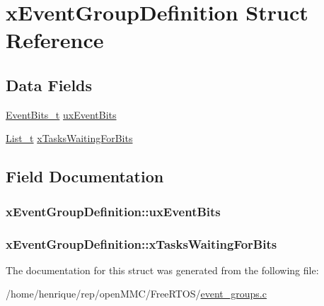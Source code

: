 \hypertarget{structxEventGroupDefinition}{\section{x\-Event\-Group\-Definition Struct Reference}
\label{structxEventGroupDefinition}
}
\subsection*{Data Fields}
\begin{DoxyCompactItemize}
\item 
\hyperlink{event__groups_8h_ab2f21b93db0b2a0ab64d7a81ff32ac2e}{Event\-Bits\-\_\-t} \hyperlink{structxEventGroupDefinition_ad7c19a46f5f4557e466209962b5e4610}{ux\-Event\-Bits}
\item 
\hyperlink{list_8h_afd590ef6400071b4d63d65ef90bea7f4}{List\-\_\-t} \hyperlink{structxEventGroupDefinition_a6570ba98d93dcba9cb03de0c62df9044}{x\-Tasks\-Waiting\-For\-Bits}
\end{DoxyCompactItemize}


\subsection{Field Documentation}
\hypertarget{structxEventGroupDefinition_ad7c19a46f5f4557e466209962b5e4610}{
\subsubsection[{ux\-Event\-Bits}]{ x\-Event\-Group\-Definition\-::ux\-Event\-Bits}}\label{structxEventGroupDefinition_ad7c19a46f5f4557e466209962b5e4610}
\hypertarget{structxEventGroupDefinition_a6570ba98d93dcba9cb03de0c62df9044}{
\subsubsection[{x\-Tasks\-Waiting\-For\-Bits}]{ x\-Event\-Group\-Definition\-::x\-Tasks\-Waiting\-For\-Bits}}\label{structxEventGroupDefinition_a6570ba98d93dcba9cb03de0c62df9044}


The documentation for this struct was generated from the following file\-:\begin{DoxyCompactItemize}
\item 
/home/henrique/rep/open\-M\-M\-C/\-Free\-R\-T\-O\-S/\hyperlink{event__groups_8c}{event\-\_\-groups.\-c}\end{DoxyCompactItemize}
